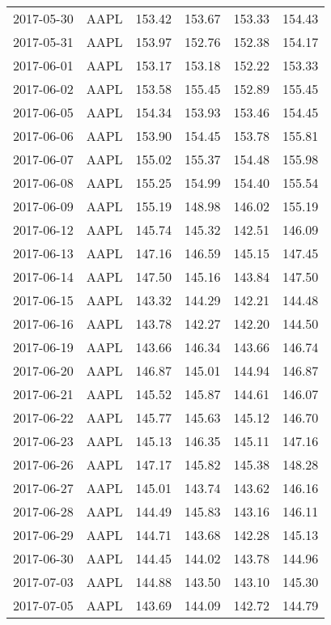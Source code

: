 \documentclass[12pt,a4paper]{report}
\begin{document}
\begin{appendices}
\begin{longtable}{llllll}
  2017-05-30 & AAPL & 153.42 & 153.67 & 153.33 & 154.43 \\ 
  2017-05-31 & AAPL & 153.97 & 152.76 & 152.38 & 154.17 \\ 
  2017-06-01 & AAPL & 153.17 & 153.18 & 152.22 & 153.33 \\ 
  2017-06-02 & AAPL & 153.58 & 155.45 & 152.89 & 155.45 \\ 
  2017-06-05 & AAPL & 154.34 & 153.93 & 153.46 & 154.45 \\ 
  2017-06-06 & AAPL & 153.90 & 154.45 & 153.78 & 155.81 \\ 
  2017-06-07 & AAPL & 155.02 & 155.37 & 154.48 & 155.98 \\ 
  2017-06-08 & AAPL & 155.25 & 154.99 & 154.40 & 155.54 \\ 
  2017-06-09 & AAPL & 155.19 & 148.98 & 146.02 & 155.19 \\ 
  2017-06-12 & AAPL & 145.74 & 145.32 & 142.51 & 146.09 \\ 
  2017-06-13 & AAPL & 147.16 & 146.59 & 145.15 & 147.45 \\ 
  2017-06-14 & AAPL & 147.50 & 145.16 & 143.84 & 147.50 \\ 
  2017-06-15 & AAPL & 143.32 & 144.29 & 142.21 & 144.48 \\ 
  2017-06-16 & AAPL & 143.78 & 142.27 & 142.20 & 144.50 \\ 
  2017-06-19 & AAPL & 143.66 & 146.34 & 143.66 & 146.74 \\ 
  2017-06-20 & AAPL & 146.87 & 145.01 & 144.94 & 146.87 \\ 
  2017-06-21 & AAPL & 145.52 & 145.87 & 144.61 & 146.07 \\ 
  2017-06-22 & AAPL & 145.77 & 145.63 & 145.12 & 146.70 \\ 
  2017-06-23 & AAPL & 145.13 & 146.35 & 145.11 & 147.16 \\ 
  2017-06-26 & AAPL & 147.17 & 145.82 & 145.38 & 148.28 \\ 
  2017-06-27 & AAPL & 145.01 & 143.74 & 143.62 & 146.16 \\ 
  2017-06-28 & AAPL & 144.49 & 145.83 & 143.16 & 146.11 \\ 
  2017-06-29 & AAPL & 144.71 & 143.68 & 142.28 & 145.13 \\ 
  2017-06-30 & AAPL & 144.45 & 144.02 & 143.78 & 144.96 \\ 
  2017-07-03 & AAPL & 144.88 & 143.50 & 143.10 & 145.30 \\ 
  2017-07-05 & AAPL & 143.69 & 144.09 & 142.72 & 144.79 \\ 

\end{longtable}
\end{appendices}
\end{document}
